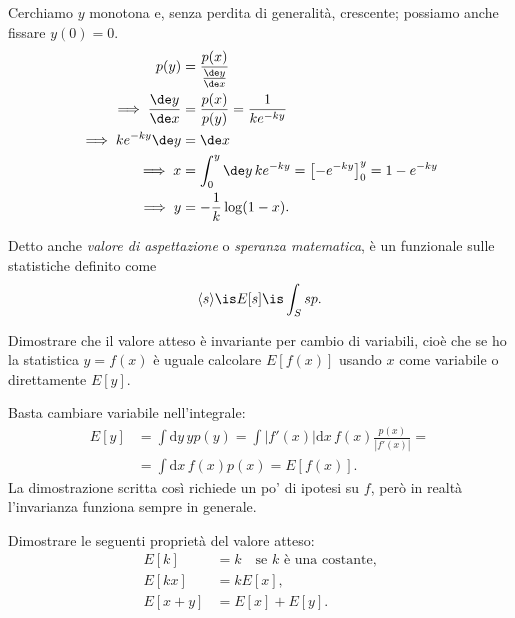 \begin{solution}
	Cerchiamo $y$ monotona e, senza perdita di generalità, crescente; possiamo anche fissare $y(0) = 0$.
	\begin{align*}
		p(y) &= \frac{p(x)}{\frac{\de y}{\de x}} \\
		\implies \frac{\de y}{\de x} &= \frac{p(x)}{p(y)} = \frac{1}{ke^{-ky}}\\
		\implies ke^{-ky}\de y &= \de x \\
		\implies x &= \int_{0}^{y} \de y\, ke^{-ky} = \left[ -e^{-ky} \right]_{0}^{y} = 1 - e^{-ky} \\
		\implies y &= -\frac1k \log(1-x).
	\end{align*}
\end{solution}

\begin{definition}
	Detto anche \emph{valore di aspettazione} o \emph{speranza matematica},
	è un funzionale sulle statistiche definito come
	\begin{equation*}
		\langle s \rangle \is E[s] \is \int_S sp.
	\end{equation*}
\end{definition}

\begin{exercise}
    Dimostrare che il valore atteso è invariante per cambio di variabili,
    cioè che se ho la statistica $y = f(x)$ è uguale calcolare $E[f(x)]$
    usando $x$ come variabile o direttamente $E[y]$.
\end{exercise}

\begin{solution}
    Basta cambiare variabile nell'integrale:
    \begin{align*}
        E[y] &= \int \mathrm dy\, y p(y)
        = \int |f'(x)|\mathrm dx\, f(x) \frac{p(x)}{|f'(x)|} = \\
        &= \int \mathrm dx\, f(x)p(x) = E[f(x)].
    \end{align*}
    La dimostrazione scritta così richiede un po' di ipotesi su $f$, però
    in realtà l'invarianza funziona sempre in generale.
\end{solution}

\begin{exercise}
    Dimostrare le seguenti proprietà del valore atteso:
    \begin{align*}
        E[k] &= k\quad\text{se $k$ è una costante,} \\
        E[kx] &= kE[x], \\
        E[x + y] &= E[x] + E[y].
    \end{align*}
\end{exercise}

